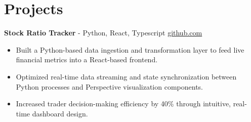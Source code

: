 \documentclass[11pt]{article}       %
\begin{document}

\vspace{-18.5pt}

\section*{Projects}

\textbf{Stock Ratio Tracker}{ - Python, React, Typescript} \hfill \href{https://github.com/Monica20030707/tradingDashboard-UI}{github.com} \\
\vspace{-9pt}
\begin{itemize}
  \item Built a Python-based data ingestion and transformation layer to feed live financial metrics into a React-based frontend.
  \item Optimized real-time data streaming and state synchronization between Python processes and Perspective visualization components.
  \item Increased trader decision-making efficiency by 40\% through intuitive, real-time dashboard design.
\end{itemize}

\end{document}
